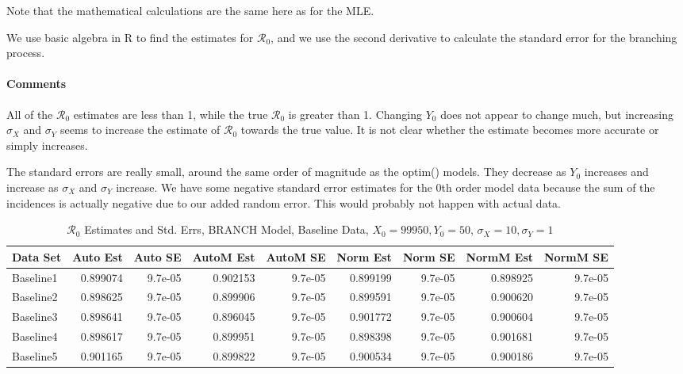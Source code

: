 \documentclass[12pt]{article}
\newcommand{\rr}{\ensuremath{\mathcal{R}_0}}
\begin{document}
Note that the mathematical calculations are the same here as for the MLE.

We use basic algebra in R to find the estimates for $\rr$, and we use the second derivative to calculate the standard error for the branching process.

\paragraph{Comments}

All of the $\rr$ estimates are less than 1, while the true $\rr$ is greater than 1. Changing $Y_0$ does not appear to change much, but increasing $\sigma_X$ and $\sigma_Y$ seems to increase the estimate of $\rr$ towards the true value. It is not clear whether the estimate becomes more accurate or simply increases.

The standard errors are really small, around the same order of magnitude as the optim() models. They decrease as $Y_0$ increases and increase as $\sigma_X$ and $\sigma_Y$ increase. We have some negative standard error estimates for the 0th order model data because the sum of the incidences is actually negative due to our added random error. This would probably not happen with actual data.

\begin{table}[H]
	
	\caption{$\rr$ Estimates and Std. Errs, BRANCH Model, 
		Baseline Data, $X_0 = 99950, Y_0 = 50$, 
		$\sigma_X = 10, \sigma_Y = 1$}
	\begin{footnotesize}
		\hskip -1cm
		\begin{tabular}{l|r|r|r|r|r|r|r|r}
			\hline
			Data Set & Auto Est & Auto SE & AutoM Est & AutoM SE & Norm Est & Norm SE & NormM Est & NormM SE\\
			\hline
			Baseline1 & 0.899074 & 9.7e-05 & 0.902153 & 9.7e-05 & 0.899199 & 9.7e-05 & 0.898925 & 9.7e-05\\
			\hline
			Baseline2 & 0.898625 & 9.7e-05 & 0.899906 & 9.7e-05 & 0.899591 & 9.7e-05 & 0.900620 & 9.7e-05\\
			\hline
			Baseline3 & 0.898641 & 9.7e-05 & 0.896045 & 9.7e-05 & 0.901772 & 9.7e-05 & 0.900604 & 9.7e-05\\
			\hline
			Baseline4 & 0.898617 & 9.7e-05 & 0.899951 & 9.7e-05 & 0.898398 & 9.7e-05 & 0.901681 & 9.7e-05\\
			\hline
			Baseline5 & 0.901165 & 9.7e-05 & 0.899822 & 9.7e-05 & 0.900534 & 9.7e-05 & 0.900186 & 9.7e-05\\
			\hline
		\end{tabular}
	\end{footnotesize}
\end{table}
\end{document}
